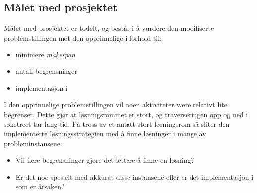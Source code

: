 \subsection{Målet med prosjektet}
Målet med prosjektet er todelt, og består i å vurdere den modifiserte problemstillingen mot den opprinnelige i forhold til:
\begin{itemize}
\item minimere \textit{makespan}
\item antall begrensninger
\item implementasjon i \ilog
\end{itemize}

I den opprinnelige problemstillingen vil noen aktiviteter være relativt lite begrenset. Dette gjør at løsningsrommet er stort, og traverseringen opp og ned i søketreet tar lang tid. På tross av et antatt stort løsningsrom så sliter den \ilog implementerte løsningsstrategien med å finne løsninger i mange av probleminstansene.

\begin{itemize}
\item Vil flere begrensninger gjøre det lettere å finne en løsning?
\item Er det noe spesielt med akkurat disse instansene eller er det implementasjon i \ilog som er årsaken?
\end{itemize}